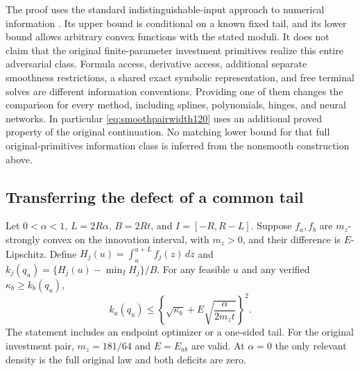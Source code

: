 The proof uses the standard indistinguishable-input approach to
numerical information \citep{Novak2015Integration97}.  Its upper
bound is conditional on a known fixed tail, and its lower bound
allows arbitrary convex functions with the stated moduli.  It
does not claim that the original finite-parameter investment
primitives realize this entire adversarial class.  Formula access,
derivative access, additional separate smoothness restrictions,
a shared exact symbolic representation, and free terminal
solves are different information conventions.
Providing one of them changes the comparison for every method,
including splines, polynomials, hinges, and neural networks.
In particular \eqref{eq:smoothpairwidth120} uses an additional
proved property of the original continuation.  No matching
lower bound for that full original-primitives information
class is inferred from the nonsmooth construction above.

\subsection{Transferring the defect of a common tail}
\begin{theorem}
\label{thm:tailtransfer120}
Let $0<\alpha<1$, $L=2R\alpha$, $B=2Rt$, and
$I=[-R,R-L]$.  Suppose $f_a,f_b$ are $m_z$-strongly convex on
the innovation interval, with $m_z>0$, and their difference is
$E$-Lipschitz.  Define
$H_j(u)=\int_u^{u+L}f_j(z)\,dz$ and
$k_j(q_u)=\{H_j(u)-\min_IH_j\}/B$.
For any feasible $u$ and any verified $\kappa_b\ge k_b(q_u)$,
\[
 k_a(q_u)\le
 \left\{\sqrt{\kappa_b}
                  +E\sqrt{\frac{\alpha}{2m_zt}}\right\}^{2}.
\]
The statement includes an endpoint optimizer or a one-sided tail.
For the original investment pair, $m_z=181/64$ and
$E=E_{ab}$ are valid.  At $\alpha=0$ the only relevant
density is the full original law and both deficits are zero.
\end{theorem}

